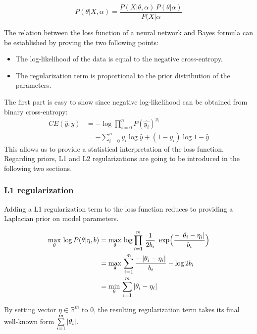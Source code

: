 	\begin{equation}
	    P(\theta \vert X, \alpha) = \frac{P(X \vert \theta, \alpha)\,P(\theta \vert \alpha)}{P(X \vert \alpha}
	\end{equation}

	The relation between the loss function of a neural network and Bayes formula can be established
	by proving the two following points:

	\begin{itemize}
	    \item The log-likelihood of the data is equal to the negative cross-entropy.
	    \item The regularization term is proportional to the prior distribution of the parameters.
	\end{itemize}

	The first part is easy to show since negative log-likelihood can be obtained from binary cross-entropy:
	\begin{align}
		CE(\hat{y}, y) & = - \log{\prod\limits_{i=0}^n P(\hat{y_i})^{y_i}}  \\
		& = -\sum\limits_{i=0}^n y_i \log{\hat{y}} + (1 - y_i) \log{1 - \hat{y}}
	\end{align}
	This allows us to provide a statistical interpretation of the loss function.
	Regarding priors, L1 and L2 regularizations are going to be introduced in the following two sections.

	\subsubsection{L1 regularization}

	   Adding a L1 regularization term to the loss function reduces to providing a Laplacian
	   prior on model parameters.  

	   \begin{align}
	       \max_{\theta}\, \log{P(\theta \vert \eta, b)} 
		   & = \max_{\theta}\, \log{\prod\limits_{i=1}^m \, \frac{1}{2b_i}\,
		   \text{ exp}\Big(\frac{- \left|\theta_i - \eta_i\right|}{b_i}\Big)} \\
		   & = \max_{\theta}\, \sum\limits_{i=1}^m \frac{- \left|\theta_i - \eta_i\right|}{b_i} - \log{2b_i} \\
		   & = \min_{\theta}\, \sum\limits_{i=1}^m \left|\theta_i - \eta_i\right|
	   \end{align}

	   By setting vector $\eta \in \mathbb{R}^m$ to $0$, the resulting regularization term
	   takes its final well-known form $\sum\limits_{i=1}^m \left|\theta_i\right|$.


